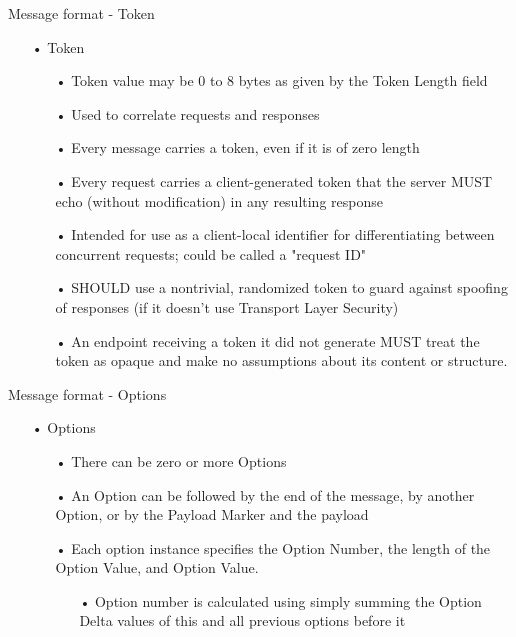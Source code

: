 \documentclass[11pt]{beamer}
\begin{document}
\begin{frame}{Message format - Token}
\begin{itemize}
\item[•] Token
\begin{itemize}
\item[•] Token value may be 0 to 8 bytes as given by the Token Length field
\item[•] Used to correlate requests and responses
\item[•] Every message carries a token, even if it is of zero length
\item[•] Every request carries a client-generated token that the server MUST echo (without modification) in any resulting response
\item[•] Intended for use as a client-local identifier for differentiating between concurrent requests; could be called a "request ID"
\item[•] SHOULD use a nontrivial, randomized token to guard against spoofing of responses (if it doesn't use Transport Layer Security)
\item[•] An endpoint receiving a token it did not generate MUST treat the token as opaque and make no assumptions about its content or structure.
\end{itemize}
\end{itemize}
\end{frame}
\begin{frame}{Message format - Options}
\begin{itemize}
\item[•] Options
\begin{itemize}
\item[•] There can be zero or more Options
\item[•] An Option can be followed by the end of the message, by another Option, or by the Payload Marker and the payload
\item[•] Each option instance specifies the Option Number, the length of the Option Value, and Option Value.
\begin{itemize}
\item[•] Option number is calculated using simply summing the Option Delta values of this and all previous options before it
\end{itemize}
\end{itemize}
\end{itemize}
\end{frame}
\end{document}

